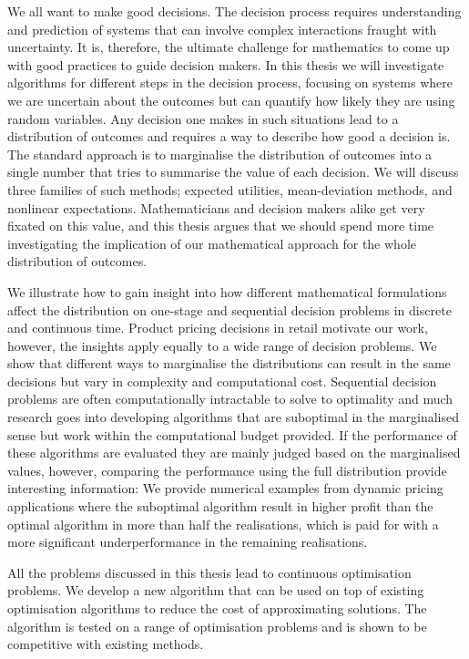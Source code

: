 \documentclass[main.tex]{subfiles}
\begin{document}
We all want to make good decisions. The decision
process requires understanding and prediction of systems that can
involve complex interactions fraught with uncertainty. It is, therefore,
the ultimate challenge for mathematics to come up with good practices
to guide decision makers.  In this thesis we will investigate
algorithms for different steps in the decision process, focusing on
systems where we are uncertain about the outcomes but can quantify how
likely they are using random variables.  Any decision one makes in
such situations lead to a distribution of outcomes and requires a way
to describe how good a decision is.  The standard approach is to
marginalise the distribution of outcomes into a single number that
tries to summarise the value of each decision.  We will discuss three
families of such methods; expected utilities, mean-deviation methods,
and nonlinear expectations.  Mathematicians and decision makers alike
get very fixated on this value, and this thesis argues that we should
spend more time investigating the implication of our mathematical
approach for the whole distribution of outcomes.

We illustrate how to gain insight into how different mathematical
formulations affect the distribution on one-stage and sequential
decision problems in discrete and continuous time. Product pricing
decisions in retail motivate our work, however, the insights
apply equally to a wide range of decision problems.  We show that
different ways to marginalise the distributions can result in the same
decisions but vary in complexity and computational
cost. Sequential decision problems are often computationally
intractable to solve to optimality and much research goes into
developing algorithms that are suboptimal in the marginalised sense
but work within the computational budget provided. If the performance
of these algorithms are evaluated they are mainly judged based on the
marginalised values, however, comparing the performance using the full
distribution provide interesting information: We provide numerical
examples from dynamic pricing applications where the suboptimal
algorithm result in higher profit than the optimal algorithm in more
than half the realisations, which is paid for with a more significant
underperformance in the remaining realisations.

All the problems discussed in this thesis lead to continuous
optimisation problems. We develop a new algorithm that can be used on
top of existing optimisation algorithms to reduce the cost of
approximating solutions. The algorithm is tested on a range of
optimisation problems and is shown to be competitive with existing
methods.
\thispagestyle{empty}
\end{document}
